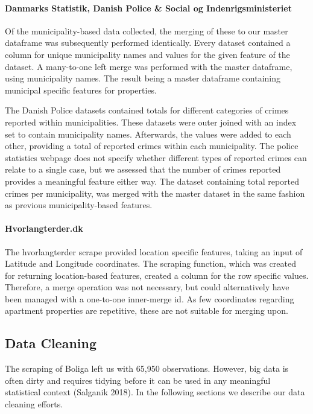 \documentclass[12pt,a4paper]{article}
\begin{document}
\paragraph{Danmarks Statistik, Danish Police \& Social og Indenrigsministeriet\newline}
Of the municipality-based data collected, the merging of these to our master dataframe was subsequently performed identically. Every dataset contained a column for unique municipality names and values for the given feature of the dataset. A many-to-one left merge was performed with the master dataframe, using municipality names. The result being a master dataframe containing municipal specific features for properties. 

The Danish Police datasets contained totals for different categories of crimes reported within municipalities. These datasets were outer joined with an index set to contain municipality names. Afterwards, the values were added to each other, providing a total of reported crimes within each municipality. The police statistics webpage does not specify whether different types of reported crimes can relate to a single case, but we assessed that the number of crimes reported provides a meaningful feature either way. The dataset containing total reported crimes per municipality, was merged with the master dataset in the same fashion as previous municipality-based features. 

\paragraph{Hvorlangterder.dk\newline}
The hvorlangterder scrape provided location specific features, taking an input of Latitude and Longitude coordinates. The scraping function, which was created for returning location-based features, created a column for the row specific values. Therefore, a merge operation was not necessary, but could alternatively have been managed with a one-to-one inner-merge id. As few coordinates regarding apartment properties are repetitive, these are not suitable for merging upon. 

\subsection{Data Cleaning}
The scraping of Boliga left us with 65,950 observations. However, big data is often dirty and requires tidying before it can be used in any meaningful statistical context (Salganik 2018). In the following sections we describe our data cleaning efforts. 
\end{document}
